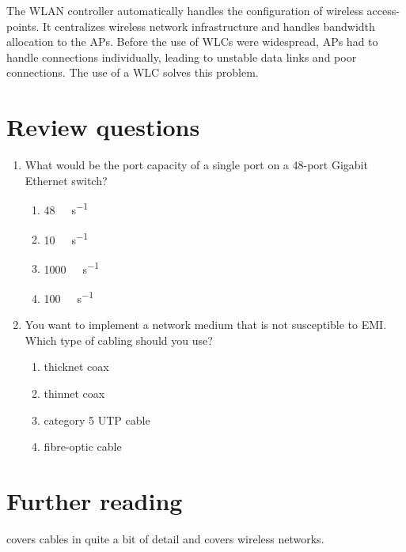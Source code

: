 The \acs{WLAN} controller automatically handles the configuration of wireless access-points.
It centralizes wireless network infrastructure and handles bandwidth allocation to the \aclp{AP}.
Before the use of \acsp{WLC} were widespread, \aclp{AP} had to handle connections individually, leading to unstable data links and poor connections.
The use of a \acs{WLC} solves this problem.


\section{Review questions}
\begin{enumerate}
\item What would be the port capacity of a single port on a 48-port Gigabit Ethernet switch?
   \begin{enumerate}
      \item \SI{48}{\giga\bit\per\second}
      \item \SI{10}{\mega\bit\per\second}
      \item \SI{1000}{\mega\bit\per\second}
      \item \SI{100}{\mega\bit\per\second}
   \end{enumerate}
\item
   You want to implement a network medium that is not susceptible to \acs{EMI}.
   Which type of cabling should you use?
   \begin{enumerate}
   \item thicknet coax
   \item thinnet coax
   \item category 5 \acs{UTP} cable
   \item fibre-optic cable
   \end{enumerate}
\end{enumerate}

\section{Further reading}
\textcite{oliviero} covers cables in quite a bit of detail and \textcite{coleman} covers wireless networks.
